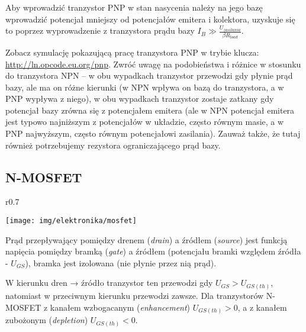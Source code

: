 \documentclass{pdfBooklets}
\begin{document}
Aby wprowadzić tranzystor PNP w stan nasycenia należy na jego bazę wprowadzić potencjał mniejszy od potencjałów emitera i kolektora, uzyskuje się to poprzez wyprowadzenie z tranzystora prądu bazy $I_B \gg \frac{U_{zasilania}}{\beta R_{load}}$.

Zobacz symulację pokazującą pracę tranzystora PNP w trybie klucza: \url{http://ln.opcode.eu.org/pnp}.
Zwróć uwagę na podobieństwa i różnice w stosunku do tranzystora NPN –
	w obu wypadkach tranzystor przewodzi gdy płynie prąd bazy, ale ma on różne kierunki (w NPN wpływa on bazą do tranzystora, a w PNP wypływa z niego),
	w obu wypadkach tranzystor zostaje zatkany gdy potencjał bazy zrówna się z potencjałem emitera (ale w NPN potencjał emitera jest typowo najniższym z potencjałów w układzie, często równym masie, a w PNP najwyższym, często równym potencjałowi zasilania).
Zauważ także, że tutaj również potrzebujemy rezystora ograniczającego prąd bazy.

\subsection{N-MOSFET}

\begin{wrapfigure}{r}{0.7\textwidth}
  \begin{center}
    \vspace{-40pt}
    \texttt{[image: img/elektronika/mosfet]}
    \vspace{-20pt}
  \end{center}
\end{wrapfigure}

Prąd przepływający pomiędzy drenem (\emph{drain}) a źródłem (\emph{source}) jest funkcją napięcia pomiędzy bramką (\emph{gate}) a źródłem (potencjału bramki względem źródła - $U_{GS}$), bramka jest izolowana (nie płynie przez nią prąd).

W kierunku dren → źródło tranzystor ten przewodzi gdy $U_{GS} > U_{GS (th)}$, natomiast w przeciwnym kierunku przewodzi zawsze. Dla tranzystorów N-MOSFET z kanałem wzbogacanym (\emph{enhancement}) $U_{GS (th)} > 0$, a z kanałem zubożonym (\emph{depletion}) $U_{GS (th)} < 0$.
\end{document}
